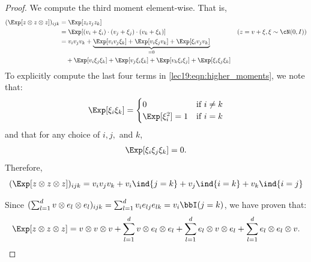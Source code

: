 \begin{proof}
We compute the third moment element-wise. That is,
\begin{align}
	(\Exp[z \otimes z \otimes z])_{ijk} &= \Exp[z_i  z_j z_k] \\
	&= \Exp[(v_i + \xi_i)\cdot (v_j + \xi_j) \cdot (v_k + \xi_k)]  &\text{$(z = v + \xi, \xi \sim \cN(0, I))$}\\
	&= v_i v_j v_k + \underbrace{\Exp [v_i v_j \xi_k] +  \Exp [v_i \xi_j v_k] +  \Exp [\xi_i v_j v_k]}_{=0} \nonumber \\ 
	&\quad + \Exp[v_i \xi_j \xi_k] + \Exp[v_j \xi_i \xi_k] + \Exp[v_k \xi_i \xi_j] + \Exp[\xi_i \xi_j \xi_k] \label{lec19:eqn:higher_moments} 
\end{align}
To explicitly compute the last four terms in \eqref{lec19:eqn:higher_moments}, we note that:
\begin{align}
    \Exp[\xi_i \xi_k] = \begin{cases} 0 &\text{if $i \neq k$} \\ \Exp[\xi_i^2] = 1 &\text{if $i = k$} \end{cases}
\end{align} 
and that for any choice of $i, j,$ and $k$,
\begin{align}
    \Exp[\xi_i \xi_j \xi_k] = 0.
\end{align}
Therefore, 
\begin{equation}
	(\Exp[z \otimes z \otimes z])_{ijk} = v_i v_j v_k + v_i \ind{j=k} +  v_j \ind{i=k}  +  v_k \ind{i=j} 
\end{equation}

Since $(\sum_{l=1}^d v \otimes e_l \otimes e_l)_{ijk} = \sum_{l=1}^d v_i  e_{lj}  e_{lk} = v_i \bbI(j=k)$, we have proven that:
\begin{equation}
	\Exp[z \otimes z \otimes z] = v \otimes v \otimes v +  \sum_{l=1}^d v \otimes e_l \otimes e_l + \sum_{l=1}^d  e_l \otimes v \otimes e_l + \sum_{l=1}^d  e_l \otimes e_l \otimes v.
\end{equation} 
\end{proof}

